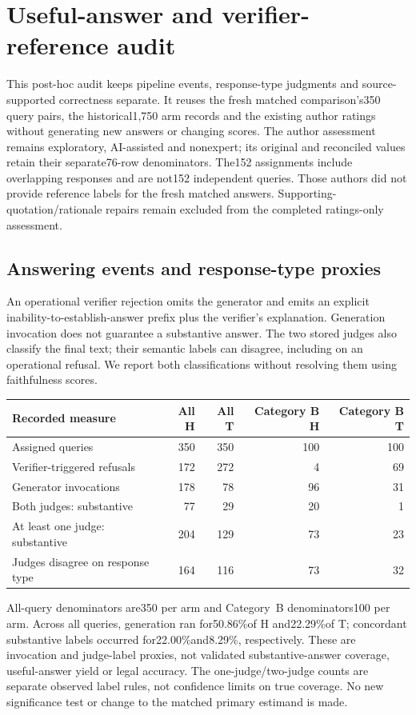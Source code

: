 \section{Useful-answer and verifier-reference audit}
\label{supp:utility-audit}
This post-hoc audit keeps pipeline events, response-type judgments and source-supported correctness separate. It reuses the fresh matched comparison's350 query pairs, the historical1,750 arm records and the existing author ratings without generating new answers or changing scores. The author assessment remains exploratory, AI-assisted and nonexpert; its original and reconciled values retain their separate76-row denominators. The152 assignments include overlapping responses and are not152 independent queries. Those authors did not provide reference labels for the fresh matched answers. Supporting-quotation/rationale repairs remain excluded from the completed ratings-only assessment.

\subsection{Answering events and response-type proxies}
An operational verifier rejection omits the generator and emits an explicit inability-to-establish-answer prefix plus the verifier's explanation. Generation invocation does not guarantee a substantive answer. The two stored judges also classify the final text; their semantic labels can disagree, including on an operational refusal. We report both classifications without resolving them using faithfulness scores.

\begin{center}\small
\begin{tabular}{lrrrr}\toprule
Recorded measure & All H & All T & Category B H & Category B T \\
\midrule
Assigned queries & 350 & 350 & 100 & 100 \\
Verifier-triggered refusals & 172 & 272 & 4 & 69 \\
Generator invocations & 178 & 78 & 96 & 31 \\
Both judges: substantive & 77 & 29 & 20 & 1 \\
At least one judge: substantive & 204 & 129 & 73 & 23 \\
Judges disagree on response type & 164 & 116 & 73 & 32 \\
\bottomrule\end{tabular}\end{center}

All-query denominators are350 per arm and Category~B denominators100 per arm. Across all queries, generation ran for50.86\%of H and22.29\%of T; concordant substantive labels occurred for22.00\%and8.29\%, respectively. These are invocation and judge-label proxies, not validated substantive-answer coverage, useful-answer yield or legal accuracy. The one-judge/two-judge counts are separate observed label rules, not confidence limits on true coverage. No new significance test or change to the matched primary estimand is made.

